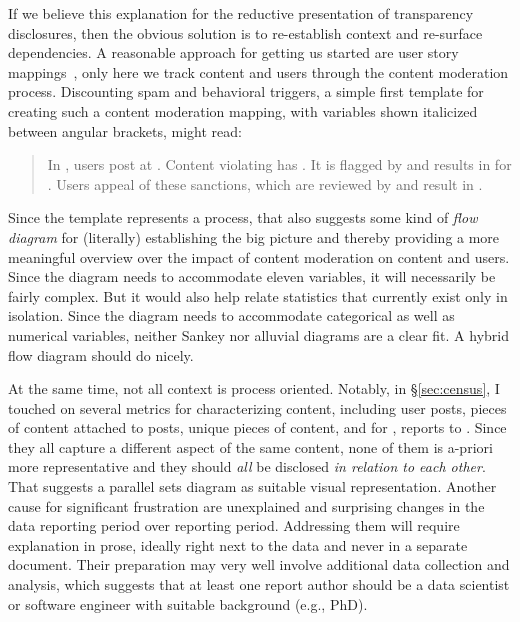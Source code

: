 If we believe this explanation for the reductive presentation of transparency
disclosures, then the obvious solution is to re-establish context and re-surface
dependencies. A reasonable approach for getting us started are user story
mappings~\cite{PattonEconomy2014}, only here we track content and users through
the content moderation process. Discounting spam and behavioral triggers, a
simple first template for creating such a content moderation mapping, with
variables shown italicized between angular brackets, might read:
\begin{quote}
In , users post  at . Content violating
 has . It is flagged by  and
results in  for . Users appeal 
of these sanctions, which are reviewed by  and result in
.
\end{quote}
Since the template represents a process, that also suggests some kind of
\emph{flow diagram} for (literally) establishing the big picture and thereby
providing a more meaningful overview over the impact of content moderation on
content and users. Since the diagram needs to accommodate eleven variables, it
will necessarily be fairly complex. But it would also help relate statistics
that currently exist only in isolation. Since the diagram needs to accommodate
categorical as well as numerical variables, neither Sankey nor alluvial diagrams
are a clear fit. A hybrid flow diagram should do nicely.

At the same time, not all context is process oriented. Notably, in
\S\ref{sec:census}, I touched on several metrics for characterizing content,
including user posts, pieces of content attached to posts, unique pieces of
content, and for , reports to . Since they all capture a different
aspect of the same content, none of them is a-priori more representative and
they should \emph{all} be disclosed \emph{in relation to each other}. That
suggests a parallel sets diagram as suitable visual representation. Another
cause for significant frustration are unexplained and surprising changes in the
data reporting period over reporting period. Addressing them will require
explanation in prose, ideally right next to the data and never in a separate
document. Their preparation may very well involve additional data collection and
analysis, which suggests that at least one report author should be a data
scientist or software engineer with suitable background (e.g., PhD).


